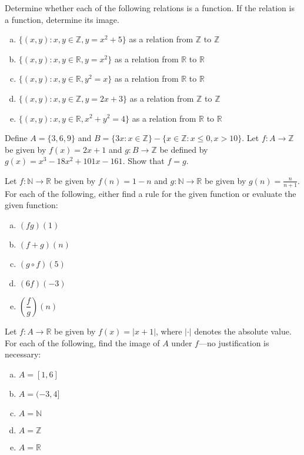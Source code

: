 \documentclass[11pt,letterpaper]{article}
\begin{document}

 Determine whether each of the following relations is a function. If the relation is a function, determine its image.
	\begin{enumerate}[(a)]
	\item $\{ (x, y) \colon x, y \in \mathbb{Z}, y= x^2 + 5 \}$ as a relation from $\mathbb{Z}$ to $\mathbb{Z}$
	\item $\{ (x, y) \colon x, y \in \mathbb{R}, y= x^2 \}$ as a relation from $\mathbb{R}$ to $\mathbb{R}$
	\item $\{ (x, y) \colon x, y \in \mathbb{R}, y^2= x \}$ as a relation from $\mathbb{R}$ to $\mathbb{R}$
	\item $\{ (x, y) \colon x, y \in \mathbb{Z}, y= 2x + 3 \}$ as a relation from $\mathbb{Z}$ to $\mathbb{Z}$
	\item $\{ (x, y) \colon x, y \in \mathbb{R}, x^2 + y^2= 4 \}$ as a relation from $\mathbb{R}$ to $\mathbb{R}$
	\end{enumerate}



\newpage



 Define $A= \{ 3, 6, 9 \}$ and $B= \{ 3x \colon x \in \mathbb{Z} \} - \{ x \in \mathbb{Z} \colon x \leq 0, x > 10 \}$. Let $f: A \to \mathbb{Z}$ be given by $f(x)= 2x + 1$ and $g: B \to \mathbb{Z}$ be defined by $g(x)= x^3 - 18x^2 + 101x - 161$. Show that $f= g$.



\newpage



 Let $f: \mathbb{N} \to \mathbb{R}$ be given by $f(n)= 1 - n$ and $g: \mathbb{N} \to \mathbb{R}$ be given by $g(n)= \frac{n}{n + 1}$. For each of the following, either find a rule for the given function or evaluate the given function:
	\begin{enumerate}[(a)]
	\item $(fg)(1)$
	\item $(f + g)(n)$
	\item $(g \circ f)(5)$
	\item $(6f)(-3)$
	\item $\left( \dfrac{f}{g} \right)(n)$
	\end{enumerate}



\newpage



 Let $f: A \to \mathbb{R}$ be given by $f(x)= |x + 1|$, where $| \cdot |$ denotes the absolute value. For each of the following, find the image of $A$ under $f$---no justification is necessary: 
	\begin{enumerate}[(a)]
	\item $A= [1, 6]$
	\item $A= (-3, 4]$
	\item $A= \mathbb{N}$
	\item $A= \mathbb{Z}$
	\item $A= \mathbb{R}$
	\end{enumerate}
\end{document}
